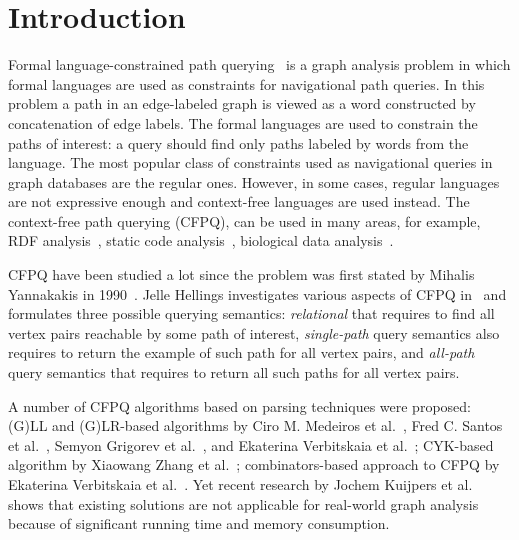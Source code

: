 \section{Introduction}

Formal language-constrained path querying~\cite{doi:10.1137/S0097539798337716} is a graph analysis problem in which formal languages are used as constraints for
navigational path queries. In this problem a path in an edge-labeled graph is viewed
as a word constructed by concatenation of edge labels. The formal languages are used to constrain the paths of interest: a query should find only paths labeled by words from the language. The most popular class of constraints used as navigational queries in graph databases are the regular ones.
However, in some cases, regular languages are not expressive enough and context-free languages are used instead. The context-free path querying (CFPQ), can be used in many areas, for example, RDF analysis~\cite{10.1007/978-3-319-46523-4_38}, static code analysis~\cite{Zheng,10.1145/373243.360208}, biological data analysis~\cite{SubgraphQueriesbyContextfreeGrammars}.

CFPQ have been studied a lot since the problem was first stated by Mihalis Yannakakis in 1990~\cite{Yannakakis}.
Jelle Hellings investigates various aspects of CFPQ in~\cite{hellingsPathQuerying,hellingsRelational,DBLP:journals/corr/Hellings15} and formulates three possible querying semantics: \textit{relational} that requires to find all vertex pairs reachable by some path of interest, \textit{single-path} query semantics also requires to return the example of such path for all vertex pairs, and \textit{all-path} query semantics that requires to return all such paths for all vertex pairs.

A number of CFPQ algorithms based on parsing techniques were proposed: (G)LL and (G)LR-based algorithms by Ciro M. Medeiros et al.~\cite{Medeiros:2018:EEC:3167132.3167265}, Fred C. Santos et al.~\cite{10.1007/978-3-319-91662-0_17}, Semyon Grigorev et al.~\cite{Grigorev:2017:CPQ:3166094.3166104}, and Ekaterina Verbitskaia et al.~\cite{10.1007/978-3-319-41579-6_22}; CYK-based algorithm by Xiaowang Zhang et al.~\cite{10.1007/978-3-319-46523-4_38}; combinators-based approach to CFPQ by Ekaterina Verbitskaia et al.~\cite{Verbitskaia:2018:PCC:3241653.3241655}.
Yet recent research by Jochem Kuijpers et al.~\cite{Kuijpers:2019:ESC:3335783.3335791} shows that existing solutions are not applicable for real-world graph analysis because of significant
running time and memory consumption.

